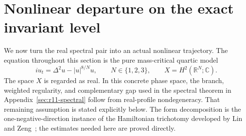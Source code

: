 \section{Nonlinear departure on the exact invariant level}
\label{sec:r12-nonlinear}

We now turn the real spectral pair into an actual nonlinear trajectory.
The equation throughout this section is the pure mass-critical quartic
model
\begin{equation}\label{eq:r12-pure-quartic}
 iu_t=\Delta^2u-|u|^{8/N}u,\qquad N\in\{1,2,3\},
 \qquad X=H^2(\mathbb R^N;\mathbb C).
\end{equation}
The space $X$ is regarded as real. In this concrete phase space, the
branch, weighted regularity, and complementary gap used in the spectral theorem in Appendix~\ref{sec:r11-spectral} follow from real-profile nondegeneracy. That remaining
assumption is stated explicitly below. The form decomposition is the
one-negative-direction instance of the Hamiltonian trichotomy developed
by Lin and Zeng~\cite{LZ}; the estimates needed here are proved directly.

